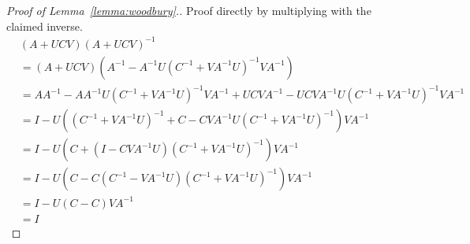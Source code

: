 \begin{proof}[Proof of Lemma~\ref{lemma:woodbury}.]
    Proof directly by multiplying with the claimed inverse.
    \begin{align*}
    &(A + UCV) (A + UCV)^{-1}\\
    &= (A + UCV) (A^{-1} - A^{-1}U(C^{-1} + VA^{-1}U)^{-1}VA^{-1})\\
    &= A A^{-1} - A A^{-1}U(C^{-1} + VA^{-1}U)^{-1}VA^{-1} + UCV A^{-1} -UCV A^{-1}U(C^{-1} + VA^{-1}U)^{-1}VA^{-1}\\
    &= I - U((C^{-1} + VA^{-1}U)^{-1} + C -CV A^{-1}U(C^{-1} + VA^{-1}U)^{-1})VA^{-1}\\
    &= I - U(C + (I - CVA^{-1}U)(C^{-1} + VA^{-1}U)^{-1})VA^{-1}\\
    &= I - U(C-C(C^{-1} - VA^{-1}U)(C^{-1} + VA^{-1}U)^{-1})VA^{-1}\\
    &= I - U(C-C)VA^{-1}\\
    &= I
    \end{align*}
\end{proof}
